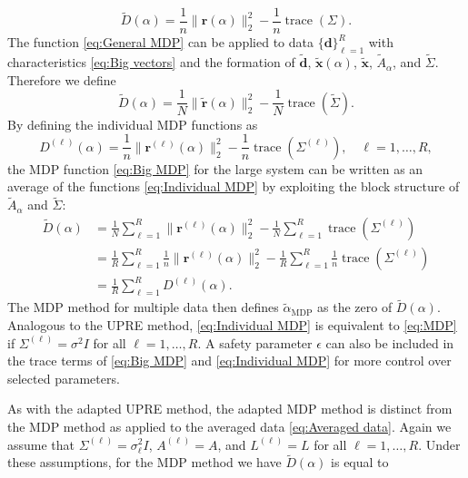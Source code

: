 \documentclass[12pt]{article}
\newcommand{\dVec}{\mathbf{d}}	%
\newcommand{\rVec}{\mathbf{r}}	%
\newcommand{\xVec}{\mathbf{x}}	%
\DeclareMathOperator{\trace}{trace}		%
\newcommand{\regparam}{\alpha}
\newcommand{\noiseSD}{\sigma}	%
\newcommand{\D}{D}	%
\newcommand{\safeparam}{\epsilon}	%
\begin{document}
\begin{equation}
\label{eq:General MDP}
\widetilde{\D}(\regparam) = \frac{1}{n}\|\rVec(\regparam)\|_2^2 - \frac{1}{n}\trace\left(\Sigma\right).
\end{equation}
The function \eqref{eq:General MDP} can be applied to data $\{\dVec\}_{\ell=1}^R$ with characteristics \eqref{eq:Big vectors} and the formation of $\widetilde{\dVec}$, $\widetilde{\xVec}(\regparam)$, $\widetilde{\xVec}$, $\widetilde{A}_{\regparam}$, and $\widetilde{\Sigma}$. Therefore we define
\begin{equation}
\label{eq:Big MDP}
\widetilde{\D}(\regparam) = \frac{1}{N}\|\widetilde{\rVec}(\regparam)\|_2^2 - \frac{1}{N}\trace\left(\widetilde{\Sigma}\right).
\end{equation}
By defining the individual MDP functions as
\begin{equation}
\label{eq:Individual MDP}
\D^{(\ell)}(\regparam) = \frac{1}{n}\|\rVec^{(\ell)}(\regparam)\|_2^2 - \frac{1}{n}\trace\left(\Sigma^{(\ell)}\right), \quad \ell = 1,\ldots,R,
\end{equation}
the MDP function \eqref{eq:Big MDP} for the large system can be written as an average of the functions \eqref{eq:Individual MDP} by exploiting the block structure of $\widetilde{A}_{\regparam}$ and $\widetilde{\Sigma}$:
\begin{align}
\label{eq:Averaged MDP}
\widetilde{\D}(\regparam) &= \frac{1}{N}\sum_{\ell=1}^R \|\rVec^{(\ell)}(\regparam)\|_2^2 - \frac{1}{N}\sum_{\ell=1}^R \trace\left(\Sigma^{(\ell)}\right) \nonumber \\
&= \frac{1}{R}\sum_{\ell=1}^R \frac{1}{n}\|\rVec^{(\ell)}(\regparam)\|_2^2 - \frac{1}{R}\sum_{\ell=1}^R \frac{1}{n}\trace\left(\Sigma^{(\ell)}\right) \nonumber \\
&= \frac{1}{R}\sum_{\ell=1}^R \D^{(\ell)}(\regparam).
\end{align}
The MDP method for multiple data then defines $\widetilde{\regparam}_{\textrm{MDP}}$ as the zero of $\widetilde{\D}(\regparam)$. Analogous to the UPRE method, \eqref{eq:Individual MDP} is equivalent to \eqref{eq:MDP} if $\Sigma^{(\ell)} = \noiseSD^2 I$ for all $\ell = 1,\ldots,R$. A safety parameter $\safeparam$ can also be included in the trace terms of \eqref{eq:Big MDP} and \eqref{eq:Individual MDP} for more control over selected parameters. \par 
As with the adapted UPRE method, the adapted MDP method is distinct from the MDP method as applied to the averaged data \eqref{eq:Averaged data}. Again we assume that $\Sigma^{(\ell)} = \noiseSD_\ell^2 I$, $A^{(\ell)} = A$, and $L^{(\ell)} = L$ for all $\ell = 1,\ldots,R$. Under these assumptions, for the MDP method we have $\widetilde{\D}(\regparam)$ is equal to
\end{document}
